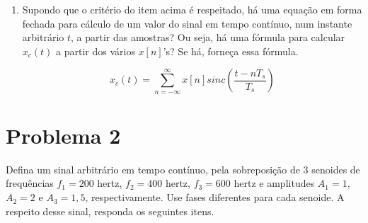 \documentclass[12pt,a4paper]{article}
\begin{document}
\begin{enumerate}
      \begin{resposta}
            O critério de Nyquist estabelece que se um sinal for amostrado com a frequência de amostragem sendo pelo menos duas vezes a frequência máxima do sinal($f_s = 2f$), é possível reconstruir o sinal contínuo a partir das amostras discretas sem erro. 

            O critério de Nyquist é suficiente, mas não necessário.
      \end{resposta}

  \item Supondo que o critério do item acima é respeitado, há uma equação em forma fechada para
        cálculo de um valor do sinal em tempo contínuo, num instante arbitrário $t$, a partir das
        amostras? Ou seja, há uma fórmula para calcular $x_c(t)$ a partir dos vários $x[n]$'s? Se há,
        forneça essa fórmula.
      \begin{resposta}
            \begin{equation*}
                  x_c(t)=\sum_{n=-\infty}^{\infty} x[n] sinc\left(\frac{t-nT_s}{T_s}\right)
            \end{equation*}
      \end{resposta}

\end{enumerate}

\section{Problema 2}
Defina um sinal arbitrário em tempo contínuo, pela sobreposição de 3 senoides de frequências
$f_1 = 200$ hertz, $f_2 = 400$ hertz, $f_3 = 600$ hertz e amplitudes $A_1 = 1$, $A_2 = 2$ e
$A_3 = 1{,}5$, respectivamente. Use fases diferentes para cada senoide. A respeito desse sinal,
responda os seguintes itens.
\end{document}
